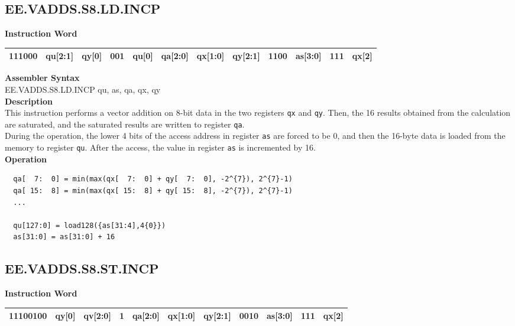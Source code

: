 \clearpage
\subsection{EE.VADDS.S8.LD.INCP}\label{instruction:EEVADDSS8LDINCP}
\setlength\tabcolsep{6pt}
\textbf{Instruction Word} \\
\begin{tabular}{|c|c|c|c|c|c|c|c|c|c|c|c|}
	\hline
	111000 & qu[2:1] & qy[0] & 001 & qu[0] & qa[2:0] & qx[1:0] & qy[2:1] & 1100 & as[3:0] & 111 & qx[2] \\
	\hline
\end{tabular}

\textbf{Assembler Syntax} \\
EE.VADDS.S8.LD.INCP qu, as, qa, qx, qy \\
\textbf{Description} \\
This instruction performs a vector addition on 8-bit data in the two registers \lstinline{qx} and \lstinline{qy}. Then, the 16 results obtained from the calculation are saturated, and the saturated results are written to register \lstinline{qa}. \\ During the operation, the lower 4 bits of the access address in register \lstinline{as} are forced to be 0, and then the 16-byte data is loaded from the memory to register \lstinline{qu}. After the access, the value in register \lstinline{as} is incremented by 16.\\
\textbf{Operation}
\begin{lstlisting}
  qa[  7:  0] = min(max(qx[  7:  0] + qy[  7:  0], -2^{7}), 2^{7}-1)
  qa[ 15:  8] = min(max(qx[ 15:  8] + qy[ 15:  8], -2^{7}), 2^{7}-1)
  ...

  qu[127:0] = load128({as[31:4],4{0}})
  as[31:0] = as[31:0] + 16
\end{lstlisting}

\clearpage
\subsection{EE.VADDS.S8.ST.INCP}\label{instruction:EEVADDSS8STINCP}
\setlength\tabcolsep{6pt}
\textbf{Instruction Word} \\
\begin{tabular}{|c|c|c|c|c|c|c|c|c|c|c|}
	\hline
	11100100 & qy[0] & qv[2:0] & 1 & qa[2:0] & qx[1:0] & qy[2:1] & 0010 & as[3:0] & 111 & qx[2] \\
	\hline
\end{tabular}

